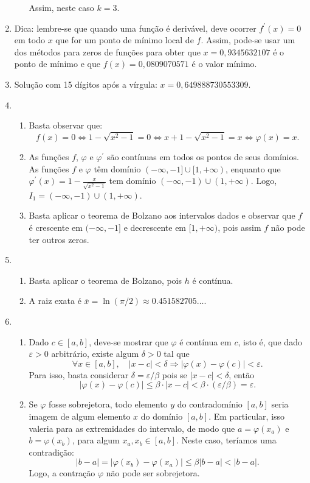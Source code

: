 \documentclass[12pt,a4paper]{article}
\begin{document}
\begin{enumerate}
\begin{enumerate}
Assim, neste caso $k = 3$.
\end{enumerate}

\item Dica: lembre-se que quando uma função é derivável, deve ocorrer $f^\prime(x) = 0$ em todo $x$ que for um ponto de mínimo local de $f$. Assim, pode-se usar um dos métodos para zeros de funções para obter que $x = 0,9345632107$ é o ponto de mínimo e que $f(x) = 0,0809070571$ é o valor mínimo.
\item Solução com 15 dígitos após a vírgula: $x = 0,649888730553309$.
\item
\begin{enumerate}
\item Basta observar que:
\[
f(x) = 0
\Leftrightarrow
1 - \sqrt{x^2 - 1} = 0
\Leftrightarrow
x + 1 - \sqrt{x^2 - 1} = x
\Leftrightarrow
\varphi(x) = x.
\]
\item As funções $f$, $\varphi$ e $\varphi^\prime$ são contínuas em todos os pontos de seus domínios. As funções $f$ e $\varphi$ têm domínio $(-\infty, -1] \cup [1, +\infty)$, enquanto que $\varphi^\prime(x) = 1 - \frac{x}{\sqrt{x^2 - 1}}$ tem domínio $(-\infty, -1) \cup (1, +\infty)$. Logo, $I_1 = (-\infty, -1) \cup (1, +\infty)$.
\item Basta aplicar o teorema de Bolzano aos intervalos dados e observar que $f$ é crescente em $(-\infty, -1]$ e decrescente em $[1, +\infty)$, pois assim $f$ não pode ter outros zeros.
\end{enumerate}
\item \begin{enumerate}
\item Basta aplicar o teorema de Bolzano, pois $h$ é contínua.
\item A raiz exata é $\overline{x} = \ln(\pi/2) \approx 0.451582705\ldots$.
\end{enumerate}
\item \begin{enumerate}
  \item Dado $c \in [a,b]$, deve-se mostrar que $\varphi$ é contínua em $c$, isto é, que dado $\varepsilon > 0$ arbitrário, existe algum $\delta > 0$ tal que
  \[
    \forall x \in [a,b], \quad |x-c| < \delta \Rightarrow |\varphi(x)-\varphi(c)| < \varepsilon.
  \]
  Para isso, basta considerar $\delta = \varepsilon / \beta$ pois se $|x - c| < \delta$, então
  \[
    |\varphi(x)-\varphi(c)|
    \leq \beta \cdot |x-c|
    < \beta \cdot (\varepsilon / \beta)
    = \varepsilon.
  \]
  \item Se $\varphi$ fosse sobrejetora, todo elemento $y$ do contradomínio $[a, b]$ seria imagem de algum elemento $x$ do domínio $[a,b]$. Em particular, isso valeria para as extremidades do intervalo, de modo que $a = \varphi(x_a)$ e $b = \varphi(x_b)$, para algum $x_a, x_b \in [a,b]$. Neste caso, teríamos uma contradição:
  \[
    |b-a| = | \varphi(x_b) - \varphi(x_a)|
    \leq \beta |b - a|
    < |b - a|.
  \]
  Logo, a contração $\varphi$ não pode ser sobrejetora.
\end{enumerate}
\end{enumerate}
\end{document}
